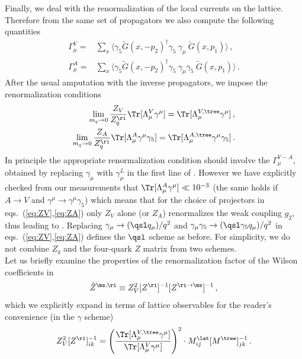 \documentclass[aps,prd,twocolumn,nofootinbib,showpacs,superscriptaddress]{revtex4-1}
\begin{document}
Finally, we deal with the renormalization of the 
local currents on the lattice.
Therefore from the same set of propagators we also compute the following quantities
\begin{equation}
\begin{split}
\Gamma^V_\mu = & \sum_x \langle \gamma_5 \tilde G(x,-p_2)^\dagger \gamma_5 \ \gamma_\mu \ \tilde G(x,p_1) \rangle \,, \\
\Gamma^A_\mu = & \sum_x \langle \gamma_5 \tilde G(x,-p_2)^\dagger \gamma_5 \ \gamma_\mu \gamma_5 \ \tilde G(x,p_1) \rangle \,.
\end{split}
\label{eq:GammaV_A}
\end{equation}
After the usual amputation with the inverse propagators, we impose the renormalization conditions
\begin{align}
\lim_{m_q \to 0} \frac{Z_V}{Z_q^\ri} \Tr[ \Lambda_\mu^V \gamma^\mu ] = \Tr [ \Lambda_\mu^{V,\tree} \gamma^\mu] \,, 
\label{eq:ZV} \\
\lim_{m_q \to 0} \frac{Z_A}{Z_q^\ri} \Tr [\Lambda_\mu^A \gamma^\mu \gamma_5 ] = \Tr [ \Lambda_\mu^{A,\tree} \gamma^\mu \gamma_5 ] \,. 
\label{eq:ZA}
\end{align}
In principle the appropriate renormalization condition should involve
 the $\Gamma^{V-A}_\mu$, obtained by replacing $\gamma_\mu$ with $\gamma_\mu^L$ in the first
line of . However we have explicitly checked from our measurements that 
$\Tr[ \Lambda_\mu^A \gamma^\mu] \ll 10^{-3}$ (the same holds if $A \to V$ and 
$\gamma^\mu \to \gamma^\mu \gamma_5$) which means 
that for the choice of projectors in eqs.~(\ref{eq:ZV},\ref{eq:ZA})
only $Z_V$ alone (or $Z_A$) renormalizes the weak coupling $g_2$, 
thus leading to .
Replacing $\gamma_\mu \to (\qsl q_\mu)/q^2$ and $\gamma_\mu \gamma_5 \to (\qsl \gamma_5 q_\mu)/q^2$
in eqs.~(\ref{eq:ZV},\ref{eq:ZA})
defines the $\qsl$ scheme as before. 
For simplicity, we do not 
combine
$Z_q$ and the four-quark $Z$ matrix from two schemes.\\

Let us briefly examine the properties of the renormalization
factor of the Wilson coefficients in 
\begin{equation}
\tilde Z^{\ms,\ri} \equiv Z_V^2 [Z^\ri]^{-1} [Z^{\ri \to \ms}]^{-1} \,,
\end{equation}
which we explicitly expand in terms of lattice observables for the
reader's convenience (in the $\gamma$ scheme)
\begin{equation}
Z_V^2 [Z^\ri]^{-1}_{ik} = \left( \frac{\Tr [ \Lambda_\mu^{V,\tree} \gamma^\mu] }{\Tr[ \Lambda_\mu^V \gamma^\mu ]} \right)^2
\cdot M^\lat_{ij} [M^\tree]^{-1}_{jk} \,.
\end{equation}
\end{document}

